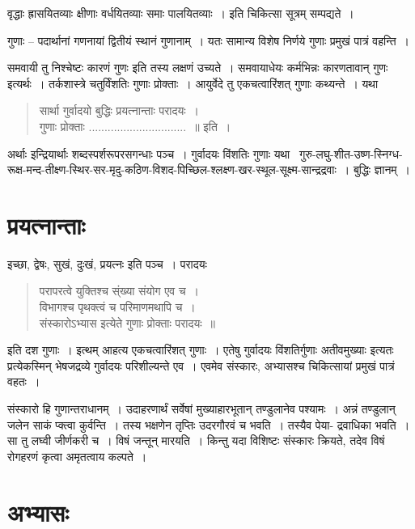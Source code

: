 {वृद्धाः ह्रासयितव्याः क्षीणाः वर्धयितव्याः समाः पालयितव्याः~। इति चिकित्सा सूत्रम् सम्पद्यते~। 

गुणाः – पदार्थानां गणनायां द्वितीयं स्थानं गुणानाम्~। यतः सामान्य विशेष निर्णये गुणाः प्रमुखं पात्रं वहन्ति~। 


समवायी तु निश्चेष्टः कारणं गुणः इति तस्य लक्षणं उच्यते~। समवायाधेयः कर्मभिन्नः कारणतावान् गुणः इत्यर्थः~। तर्कशास्त्रे चतुर्विंशतिः गुणाः प्रोक्ताः~। आयुर्वेदे तु एकचत्वारिंशत् गुणाः कथ्यन्ते~। यथा

\begin{verse}
सार्था गुर्वादयो बुद्धिः प्रयत्नान्ताः परादयः~। \\
गुणाः प्रोक्ताः ...............................~॥ इति~। 
\end{verse}
अर्थाः इन्द्रियार्थाः शब्दस्पर्शरूपरसगन्धाः पञ्च~। गुर्वादयः विंशतिः गुणाः यथा \ गुरु-लघु-शीत-उष्ण-स्निग्ध- रूक्ष-मन्द-तीक्ष्ण-स्थिर-सर-मृदु-कठिण-विशद-पिच्छिल-श्लक्ष्ण-खर-स्थूल-सूक्ष्म-सान्द्रद्रवाः~। बुद्धिः ज्ञानम्~। 

\section*{प्रयत्नान्ताः}

इच्छा, द्वेषः, सुखं, दुःखं, प्रयत्नः इति पञ्च~। परादयः

\begin{verse}
परापरत्वे युक्तिश्च स्ंख्या संयोग एव च~। \\
विभागश्च पृथक्त्वं च परिमाणमथापि च~। \\
संस्कारोऽभ्यास इत्येते गुणाः प्रोक्ताः परादयः~॥
\end{verse}
इति दश गुणाः~। इत्थम् आहत्य एकचत्वारिंशत् गुणाः~। एतेषु गुर्वादयः विंशतिर्गुणाः अतीवमुख्याः इत्यतः प्रत्येकस्मिन् भेषजद्रव्ये गुर्वादयः परिशील्यन्ते एव~। एवमेव संस्कारः, अभ्यासश्च चिकित्सायां प्रमुखं पात्रं वहतः~। 

संस्कारो हि गुणान्तराधानम्~। उदाहरणार्थं सर्वेषां मुख्याहारभूतान् तण्डुलानेव पश्यामः~। अन्नं तण्डुलान् जलेन साकं प्क्त्वा कुर्वन्ति~। तस्य भक्षणेन तृप्तिः उदरगौरवं च भवति~। तस्यैव पेया- {\fontsize{14}{16}\selectfont {}} द्रवाधिका भवति~। सा तु लघ्वी जीर्णकरी च~। विषं जन्तून् मारयति~। किन्तु यदा विशिष्टः संस्कारः क्रियते, तदेव विषं रोगहरणं कृत्वा अमृतत्वाय कल्पते~। 

\section*{अभ्यासः}

}
